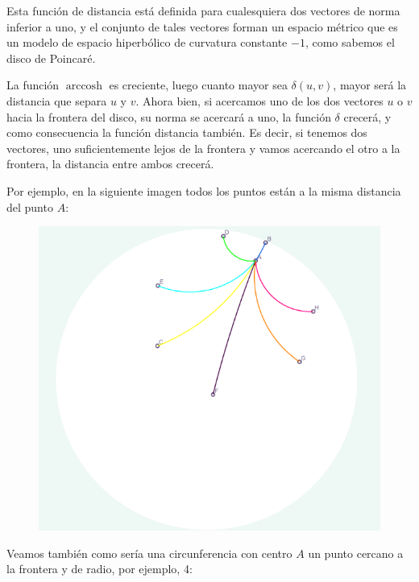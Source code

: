 \documentclass{article}
\theoremstyle{plain}
\theoremstyle{definition}
\theoremstyle{remark}
\begin{document}
Esta función de distancia está definida para cualesquiera dos vectores
de norma inferior a uno, y el conjunto de tales vectores forman un
espacio métrico que es un modelo de espacio hiperbólico de curvatura
constante $-1$, como sabemos el disco de Poincaré.

La función $\operatorname{arccosh}$ es creciente, luego cuanto mayor
sea $\delta(u,v)$, mayor será la distancia que separa $u$ y $v$. Ahora
bien, si acercamos uno de los dos vectores $u$ o $v$ hacia la frontera
del disco, su norma se acercará a uno, la función $\delta$ crecerá, y
como consecuencia la función distancia también. Es decir, si tenemos
dos vectores, uno suficientemente lejos de la frontera y vamos
acercando el otro a la frontera, la distancia entre ambos crecerá.

Por ejemplo, en la siguiente imagen todos los puntos están a la misma
distancia del punto $A$:

\begin{figure}[h]
\includegraphics{Distancias.png}
\end{figure}

Veamos también como sería una circunferencia con centro $A$ un punto
cercano a la frontera y de radio, por ejemplo, 4:
\end{document}
